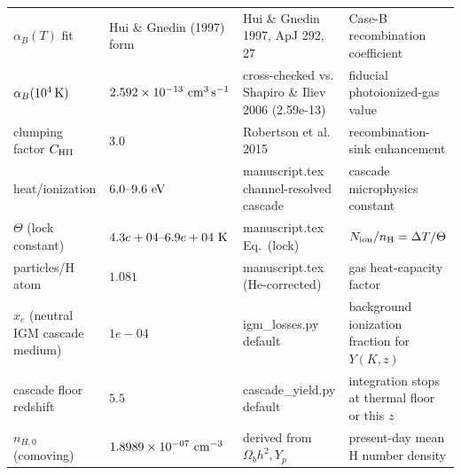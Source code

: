 \begin{table}[H]
\begin{tabular}{@{}p{4.3cm}p{3.6cm}p{4.2cm}p{4.3cm}@{}}
$\alpha_B(T)$ fit & Hui \& Gnedin (1997) form & Hui \& Gnedin 1997, ApJ 292, 27 & Case-B recombination coefficient \\
$\alpha_B(10^4\,{\rm K})$ & $2.592\times10^{-13}\ {\rm cm^3\,s^{-1}}$ & cross-checked vs. Shapiro \& Iliev 2006 (2.59e-13) & fiducial photoionized-gas value \\
clumping factor $C_{\rm HII}$ & $3.0$ & Robertson et al. 2015 & recombination-sink enhancement \\
heat/ionization & $6.0\text{--}9.6\ {\rm eV}$ & manuscript.tex channel-resolved cascade & cascade microphysics constant \\
$\Theta$ (lock constant) & $4.3e+04\text{--}6.9e+04\ {\rm K}$ & manuscript.tex Eq.~(lock) & $N_{\rm ion}/n_{\rm H}=\Delta T/\Theta$ \\
particles/H atom & $1.081$ & manuscript.tex (He-corrected) & gas heat-capacity factor \\
$x_e$ (neutral IGM cascade medium) & $1e-04$ & igm\_losses.py default & background ionization fraction for $Y(K,z)$ \\
cascade floor redshift & $5.5$ & cascade\_yield.py default & integration stops at thermal floor or this $z$ \\
$n_{H,0}$ (comoving) & $1.8989\times10^{-07}\ {\rm cm^{-3}}$ & derived from $\Omega_b h^2, Y_p$ & present-day mean H number density \\
\bottomrule
\end{tabular}
\end{table}